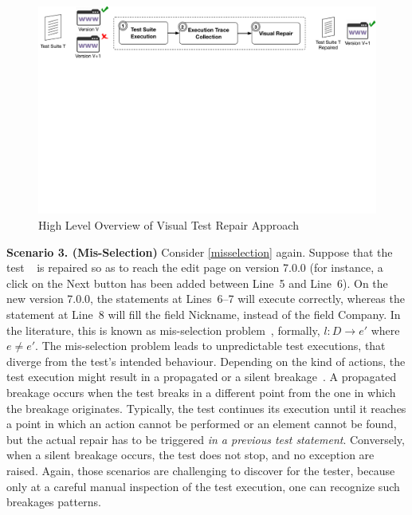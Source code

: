 \begin{figure}[t]
\centering
\includegraphics[trim={0.0cm 18cm 0.0cm 0cm},clip,scale=0.435]{images/approach-reduced2}
\caption{High Level Overview of Visual Test Repair Approach}
\label{approach}
\end{figure}

\noindent
\textbf{Scenario 3. (Mis-Selection)} Consider \autoref{misselection} again. 
Suppose that the test~\textcircled{} is repaired so as to reach the edit page on version 7.0.0 (for instance, a click on the Next button has been added between Line~5 and Line~6). On the new version 7.0.0, the statements at Lines~6--7 will execute correctly, whereas the statement at Line~8 will fill the field Nickname, instead of the field Company. In the literature, this is known as mis-selection problem~\cite{Choudhary:2011:WWA:2002931.2002935}, formally, $l: D \rightarrow e'$ where $e \ne e'$. The mis-selection problem leads to unpredictable test executions, that diverge from the test's intended behaviour. Depending on the kind of actions, the test execution might result in a propagated or a silent breakage~\cite{Hammoudi-2016-ICST}. A propagated breakage occurs when the test breaks in a different point from the one in which the breakage originates. Typically, the test continues its execution until it reaches a point in which an action cannot be performed or an element cannot be found, but the actual repair has to be triggered \textit{in a previous test statement}. Conversely, when a silent breakage occurs, the test does not stop, and no exception are raised. Again, those scenarios are challenging to discover for the tester, because only at a careful manual inspection of the test execution, one can recognize such breakages patterns.

